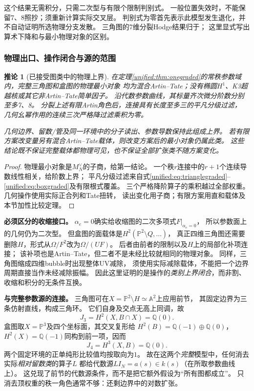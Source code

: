 \documentclass[11pt,a4paper,oneside]{ctexart}
\theoremstyle{cnplain}
\newtheorem{corollary}[theorem]{推论}
\theoremstyle{definition}
\theoremstyle{remark}
\newcommand{\Q}{\mathbb Q}
\numberwithin{equation}{section}
\begin{document}
这个结果无需积分，只需二次型与有限个限制判别式。
一般位置失效时，不能保留7、8照抄；须重新计算实际交叉层。
判别式为零首先表示此模型发生退化，并不自动证明所选物理分支发散。
三角图的7维分裂Hodge结果归于\cite[Proposition10.1]{bkone}；
这里显式写出算术下降和与最小物理对象的区别。

\subsubsection{物理出口、操作闭合与源的范围}
\begin{corollary}[已接受图类中的物理上界]\label{unified:cor:oneoperations}
在定理\ref{unified:thm:onegraded}的常秩参数域内，完整三角图和盒图的物理最小对象
均为混合Artin--Tate；没有椭圆$H^1$、K3超越核或其它非Artin--Tate简单因子。
沿代数参数曲线，其标量齐次微分阶数分别至多7、8。
分裂上述有限Artin角色后，连接具有长度至多三的平凡分级过滤，
几何幺幂作用的连续三次严格降过滤乘积为零。

几何边界、留数/管及同一环境中的分子读出、参数导数保持此组成上界。
若有限方案改变量另有混合Artin--Tate载体，则改变方案后的最小对象仍属此类。
这些结论既不保证完整载体都物理可见，也不保证全部扩张类不随方案变化。
\end{corollary}
\begin{proof}
物理最小对象是$M_N^\vee$的子商，给第一结论。
一个秩$r$连接中的$r+1$个连续导数线性相关，给阶数上界；
平凡分级过滤来自式\eqref{unified:eq:trianglegraded}--\eqref{unified:eq:boxgraded}及有限根式覆盖。
三个严格降阶算子的乘积越过全部权重。
几何操作使用实际正合列和Tate扭转，
读出变化用子商；有限方案用直和载体及本节加性比较定理。
\end{proof}

\textbf{必须区分的收缩接口。}
$\alpha_e=0$确实给收缩图的二次多项式$F|_{\alpha_e=0}$，
所以参数面上的几何仍为二次型。
但盒图的面载体是$H^2(\mathbb P^2\setminus Q,\ldots)$，
真正四维三角图还需要删除$H$，形式从$\Omega/F^2$改为$\Omega/(UF)$。
后者由前者的限制以及$H$上的局部化补项连接；
该补项也是Artin--Tate，但二者不是未经比较就相同的物理对象。
同样，三角图缩成四维bubble时出现整体UV减除，
须使用实际减除载体，不能把一个边界周期直接当作未经减除振幅。
因此这里证明的是操作的\emph{类别上界闭合}，而非割、收缩和积分的无条件互换。

\textbf{与完整参数源的连接。}
三角图可在$X=\mathbb P^2\setminus H\simeq\mathbb A^2$上应用前节，
其固定边界为三条仿射直线，构成三角环。
它们自身及交点无高上同调，故
\[
 J_3=H^2(X,B\cap X)=\Q(0).
\]
盒图取$X=\mathbb P^3$及四个坐标面，其交叉复形给
$H^2(B)=\Q(-1)\oplus\Q(0)$，
$H^2(X)=\Q(-1)$同构到前一项，因而
\[
 J_4=H^3(X,B)=\Q(0).
\]
两个固定环境的正单纯形比较值均按取向为$1$。
故在这两个\emph{完整}模型中，任何消去实际\emph{相对留数类}的算子$L$
都给代数源$LI_N=a(s)\in k(s)$（在所取参数曲线上）。
这兑现了前节的代数源条件，而不是把它额外假设为“所有图都成立”。
只消去顶权重的秩一角色通常不够：还剩边界中的对数扩张。
\end{document}
